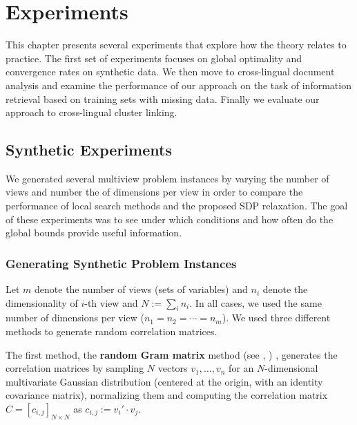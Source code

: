 %
\chapter{Experiments}\label{chap:experiments}

This chapter presents several experiments that explore how the theory relates
to practice. The first set of experiments focuses on global optimality
and convergence rates on synthetic data. We then move to
cross-lingual document analysis and examine the performance
of our approach on the task of information retrieval based
on training sets with missing data. Finally we evaluate our
approach to cross-lingual cluster linking.

\section{Synthetic Experiments}\label{chap:experiments:synthetic}
We generated several multiview problem instances by varying the number
of views and number the of dimensions per view in order to
compare the performance of local search methods and the proposed
SDP relaxation. The goal of these experiments was to see
under which conditions and how often do the global bounds
provide useful information.

\subsection{Generating Synthetic Problem Instances}

Let $m$ denote the number of views (sets of variables) and 
$n_i$ denote the dimensionality of $i$-th
view and $N := \sum_i n_i$. In all cases, we used the same number
of dimensions per view ($n_1 = n_2 = \cdots = n_m$). We used
three different methods to generate random correlation matrices.

The first method, the \textbf{random Gram matrix} method (see
\cite{Holmes:1991:RCM:105724.105730}, \cite{Bendel_Mickey_78}) ,
generates the correlation matrices by sampling $N$ vectors $v_1,
\ldots, v_n$ for an $N$-dimensional multivariate Gaussian
distribution (centered at the origin, with an identity covariance
matrix), normalizing them and computing the correlation matrix $C
= \left[c_{i,j}\right]_{N \times N}$ as $c_{i,j} := v_i' \cdot v_j$.

